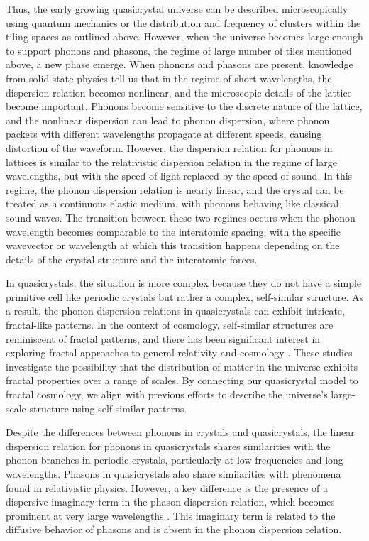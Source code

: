 \documentclass[sn-mathphys-num]{sn-jnl}%
\begin{document}
Thus, the early growing quasicrystal universe can be described microscopically using quantum mechanics or the distribution and frequency of clusters within the tiling spaces as outlined above. 
However, when the universe becomes large enough to support phonons and phasons, the regime of large number of tiles mentioned above, a new phase emerge. 
When phonons and phasons are present, knowledge from solid state physics tell us that in the regime of short wavelengths, the dispersion relation becomes nonlinear, and the microscopic details of the lattice become important. Phonons become sensitive to the discrete nature of the lattice, and the nonlinear dispersion can lead to phonon dispersion, where phonon packets with different wavelengths propagate at different speeds, causing distortion of the waveform. 
However, the dispersion relation for phonons in lattices is similar to the relativistic dispersion relation in the regime of large wavelengths, but with the speed of light replaced by the speed of sound. In this regime, the phonon dispersion relation is nearly linear, and the crystal can be treated as a continuous elastic medium, with phonons behaving like classical sound waves. 
The transition between these two regimes occurs when the phonon wavelength becomes comparable to the interatomic spacing, with the specific wavevector or wavelength at which this transition happens depending on the details of the crystal structure and the interatomic forces.

In quasicrystals, the situation is more complex because they do not have a simple primitive cell like periodic crystals but rather a complex, self-similar structure. As a result, the phonon dispersion relations in quasicrystals can exhibit intricate, fractal-like patterns. In the context of cosmology, self-similar structures are reminiscent of fractal patterns, and there has been significant interest in exploring fractal approaches to general relativity and cosmology \cite{Barbour2003, Pietronero1987, Labini1998, Joyce2005}. These studies investigate the possibility that the distribution of matter in the universe exhibits fractal properties over a range of scales. By connecting our quasicrystal model to fractal cosmology, we align with previous efforts to describe the universe's large-scale structure using self-similar patterns.

Despite the differences between phonons in crystals and quasicrystals, the linear dispersion relation for phonons in quasicrystals shares similarities with the phonon branches in periodic crystals, particularly at low frequencies and long wavelengths. Phasons in quasicrystals also share similarities with phenomena found in relativistic physics. However, a key difference is the presence of a dispersive imaginary term in the phason dispersion relation, which becomes prominent at very large wavelengths \cite{Baggioli:2020haa, Lubensky}. This imaginary term is related to the diffusive behavior of phasons and is absent in the phonon dispersion relation.
\end{document}
